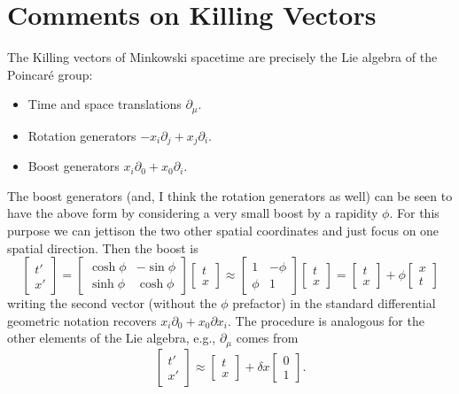 \documentclass{report}
\begin{document}
\section{Comments on Killing Vectors}
The Killing vectors of Minkowski spacetime are precisely the Lie algebra of 
the Poincar\'e group: 
\begin{itemize}
\item Time and space translations $ \partial_\mu $. 
\item Rotation generators $ - x_i \partial_j + x_j \partial_i $.
\item Boost generators $ x_i\partial_0 + x_0 \partial_i $.
\end{itemize}
The boost generators (and, I think the rotation generators as well) can be 
seen to have the above form by considering a very small boost by a rapidity 
$ \phi $. For this purpose we can jettison the two other spatial coordinates 
and just focus on one spatial direction. Then the boost is
\begin{equation*}
	\begin{bmatrix}
		t'\\x'
	\end{bmatrix}
	= 
	\begin{bmatrix}
		\cosh\phi & -\sin\phi \\ \sinh\phi & \cosh\phi
	\end{bmatrix}
	\begin{bmatrix}
	t\\x
	\end{bmatrix}
	\approx 
	\begin{bmatrix}
	1 & -\phi \\ \phi & 1
	\end{bmatrix}
	\begin{bmatrix}
	t\\x
	\end{bmatrix}
	 = \begin{bmatrix}
	 t\\x
	 \end{bmatrix}
	  + \phi \begin{bmatrix}
	  x \\ t 
	  \end{bmatrix}
\end{equation*}
writing the second vector (without the $ \phi $ prefactor) in the standard
differential geometric notation recovers $ x_i \partial_0 + x_0\partial x_i $.
The procedure is analogous for the other elements of the Lie algebra, e.g., 
$ \partial_\mu $ comes from 
\begin{equation*}
	\begin{bmatrix}
	t' \\ x'
	\end{bmatrix}
	\approx 
	\begin{bmatrix}
	t\\x 
	\end{bmatrix}
	+ \delta x  
	\begin{bmatrix}
	0 \\ 1
	\end{bmatrix}.
\end{equation*}
\end{document}
